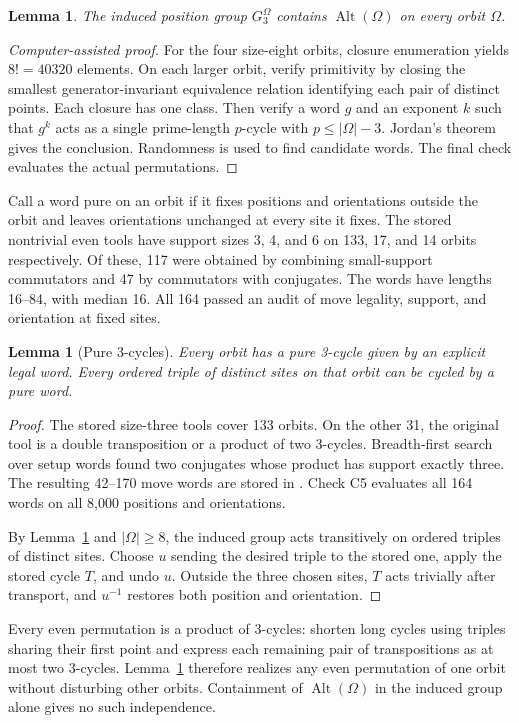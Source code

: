 \documentclass[a4paper,11pt]{article}
\newtheorem{lemma}[theorem]{Lemma}
\theoremstyle{definition}
\newcommand{\Alt}{\operatorname{Alt}}
\newcommand{\code}[1]{\path{#1}}
\begin{document}
\begin{lemma}\label{lem:alt}
The induced position group $G_3^\Omega$ contains $\Alt(\Omega)$ on
every orbit $\Omega$.
\end{lemma}
\begin{proof}[Computer-assisted proof]
For the four size-eight orbits, closure enumeration yields $8!=40320$
elements. On each larger orbit, verify primitivity by closing the
smallest generator-invariant equivalence relation identifying each pair
of distinct points. Each closure has one class. Then verify a word $g$
and an exponent $k$ such that $g^k$ acts as a single prime-length
$p$-cycle with $p\le|\Omega|-3$. Jordan's theorem gives the conclusion.
Randomness is used to find candidate words. The final check evaluates
the actual permutations.
\end{proof}

Call a word pure on an orbit if it fixes positions and orientations
outside the orbit and leaves orientations unchanged at every site it
fixes. The stored nontrivial even tools have support sizes 3, 4, and 6
on 133, 17, and 14 orbits respectively. Of these, 117 were obtained by
combining small-support commutators and 47 by commutators with conjugates.
The words have lengths 16--84, with median 16. All 164 passed an audit
of move legality, support, and orientation at fixed sites.

\begin{lemma}[Pure 3-cycles]\label{lem:pure}
Every orbit has a pure 3-cycle given by an explicit legal word.
Every ordered triple of distinct sites on that orbit can be cycled
by a pure word.
\end{lemma}
\begin{proof}
The stored size-three tools cover 133 orbits. On the other 31,
the original tool is a double transposition or a product of two
3-cycles. Breadth-first search over setup words found two conjugates
whose product has support exactly three. The resulting 42--170 move
words are stored in \code{level3SliceReductionCertifiedData.ts}.
Check C5 evaluates all 164 words on all 8,000 positions and orientations.

By Lemma~\ref{lem:alt} and $|\Omega|\ge8$, the induced group acts
transitively on ordered triples of distinct sites. Choose $u$ sending
the desired triple to the stored one, apply the stored cycle $T$, and
undo $u$. Outside the three chosen sites, $T$ acts trivially after
transport, and $u^{-1}$ restores both position and orientation.
\end{proof}
Every even permutation is a product of 3-cycles: shorten long
cycles using triples sharing their first point and express each
remaining pair of transpositions as at most two 3-cycles.
Lemma~\ref{lem:pure} therefore realizes any even permutation of
one orbit without disturbing other orbits. Containment of
$\Alt(\Omega)$ in the induced group alone gives no such independence.
\end{document}
